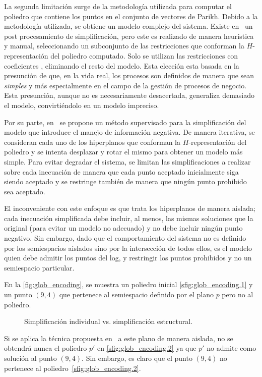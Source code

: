 La segunda limitación surge de la metodología utilizada para computar el poliedro que contiene los 
puntos en el conjunto de vectores de Parikh. Debido a la metodología utilizada, se obtiene un 
modelo complejo del sistema. Existe en~\cite{CarmonaC14} un post procesamiento de simplificación, pero este es
realizado de manera heurística y manual, seleccionando un subconjunto de las restricciones que conforman la
$H$-representación del poliedro computado. Solo se utilizan las restricciones con coeficientes , 
eliminando el resto del modelo. 
Esta elección esta basada en la presunción de que, en la vida real, los procesos son definidos de manera
que sean \textit{simples} y más especialmente en el campo de la gestión de procesos de negocio. Esta presunción,
aunque no es necesariamente desacertada, generaliza demasiado el modelo, convirtiéndolo en un modelo
impreciso.

Por su parte, en~\cite{LeonCB15} se propone un método supervisado para la simplificación del modelo que 
introduce el manejo de información negativa.
De manera iterativa, se consideran cada uno de los hiperplanos que conforman la $H$-representación del poliedro
y se intenta desplazar y rotar el mismo para obtener un modelo más simple.
Para evitar degradar el sistema, se limitan las simplificaciones a realizar sobre cada inecuación
de manera que cada punto aceptado inicialmente siga siendo aceptado y se restringe también
de manera que ningún punto prohibido sea aceptado.

El inconveniente con este enfoque es que trata los hiperplanos de manera aislada; cada inecuación
simplificada debe incluir, al menos, las mismas soluciones que la original (para evitar un modelo no adecuado) y no
debe incluir ningún punto negativo. Sin embargo, dado que el comportamiento del sistema no es definido por los 
semiespacios aislados sino por la intersección de todos ellos, es el modelo quien debe admitir los puntos del log,
y restringir los puntos prohibidos y no un semiespacio particular.

\begin{example}
    \label{ex:prob_gen}
    En la \autoref{fig:glob_encoding}, se muestra un poliedro inicial \autoref{sfig:glob_encoding.1} 
    y un punto $(9,4)$ que pertenece al semiespacio definido por el plano $p$ pero no al poliedro.

    \begin{figure}[H]
      \centering
      \hfill
      \caption{Simplificación individual vs. simplificación estructural.}
      \label{fig:glob_encoding}
    \end{figure}

    Si se aplica la técnica propuesta en~\cite{LeonCB15} a este plano de manera aislada,
    no se obtendrá nunca el poliedro $p'$ en \autoref{sfig:glob_encoding.2} ya que
    $p'$ no admite como solución al punto $(9,4)$. 
    Sin embargo, es claro que el punto $(9,4)$ no pertenece al poliedro~\autoref{sfig:glob_encoding.2}.
\end{example}

